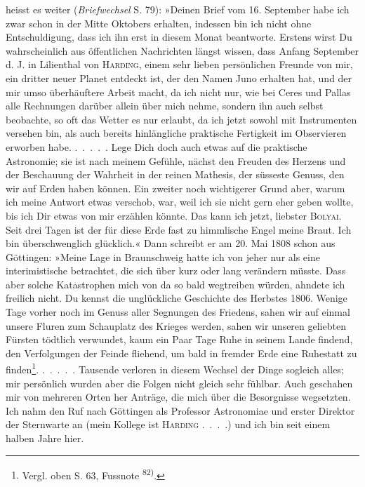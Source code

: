 \clearpage{}
 heisst es weiter (\textit{Briefwechsel} S. 79): »Deinen Brief vom 16. September
habe ich zwar schon in der Mitte Oktobers erhalten, indessen bin ich nicht
ohne Entschuldigung, dass ich ihn erst in diesem Monat beantworte. Erstens
wirst Du wahrscheinlich aus öffentlichen Nachrichten längst wissen, dass Anfang
September d. J. in Lilienthal von \textsc{Harding}, einem sehr lieben persönlichen
Freunde von mir, ein dritter neuer Planet entdeckt ist, der den Namen
Juno erhalten hat, und der mir umso überhäuftere Arbeit macht, da ich nicht
nur, wie bei Ceres und Pallas alle Rechnungen darüber allein über mich
nehme, sondern ihn auch selbst beobachte, so oft das Wetter es nur erlaubt,
da ich jetzt sowohl mit Instrumenten versehen bin, als auch bereits hinlängliche
praktische Fertigkeit im Observieren erworben habe. .\ .\ .\ .\ . Lege Dich
doch auch etwas auf die praktische Astronomie; sie ist nach meinem Gefühle,
nächst den Freuden des Herzens und der Beschauung der Wahrheit in der
reinen Mathesis, der süsseste Genuss, den wir auf Erden haben können. Ein
zweiter noch wichtigerer Grund aber, warum ich meine Antwort etwas verschob,
war, weil ich sie nicht gern eher geben wollte, bis ich Dir etwas von
mir erzählen könnte. Das kann ich jetzt, liebster \textsc{Bolyai}. Seit drei Tagen
ist der für diese Erde fast zu himmlische Engel meine Braut. Ich bin überschwenglich
glücklich.« Dann schreibt er am 20. Mai 1808 schon aus Göttingen:
»Meine Lage in Braunschweig hatte ich von jeher nur als eine interimistische
betrachtet, die sich über kurz oder lang verändern müsste. Dass
aber solche Katastrophen mich von da so bald wegtreiben würden, ahndete
ich freilich nicht. Du kennst die unglückliche Geschichte des Herbstes 1806.
Wenige Tage vorher noch im Genuss aller Segnungen des Friedens, sahen
wir auf einmal unsere Fluren zum Schauplatz des Krieges werden, sahen wir
unseren geliebten Fürsten tödtlich verwundet, kaum ein Paar Tage Ruhe in
seinem Lande findend, den Verfolgungen der Feinde fliehend, um bald in
fremder Erde eine Ruhestatt zu finden\footnote{Vergl. oben S. 63, Fussnote \textsuperscript{82)}.}. .\ .\ .\ .\ . Tausende verloren in diesem
Wechsel der Dinge sogleich alles; mir persönlich wurden aber die Folgen
nicht gleich sehr fühlbar. Auch geschahen mir von mehreren Orten her Anträge,
die mich über die Besorgnisse wegsetzten. Ich nahm den Ruf nach
Göttingen als Professor Astronomiae und erster Direktor der Sternwarte an
(mein Kollege ist \textsc{Harding} .\ .\ .\ .) und ich bin seit einem halben Jahre hier.\par

